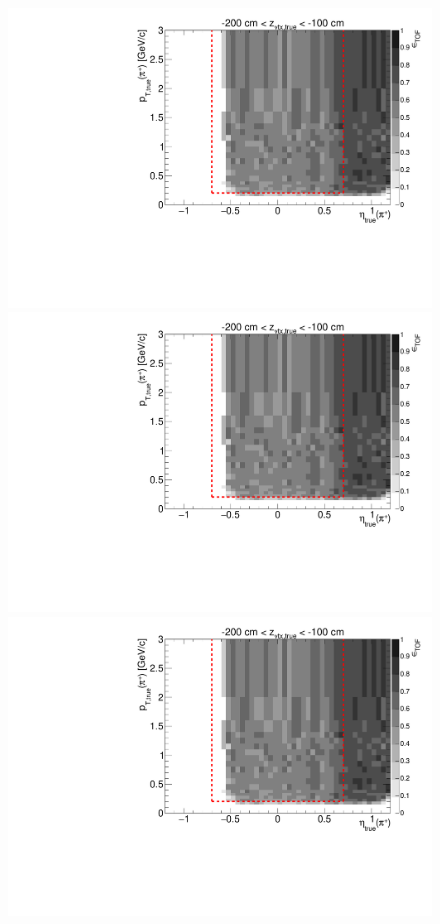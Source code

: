 \begin{figure}[hb]\ContinuedFloat
\centering
\parbox{0.495\textwidth}{
  \centering
  \includegraphics[width=\linewidth,page=11]{graphics/eff/Eff2D_TOF_pion_Plus.pdf}\\
  \includegraphics[width=\linewidth,page=13]{graphics/eff/Eff2D_TOF_pion_Plus.pdf}\\
  \includegraphics[width=\linewidth,page=15]{graphics/eff/Eff2D_TOF_pion_Plus.pdf}\\
}
\end{figure}
